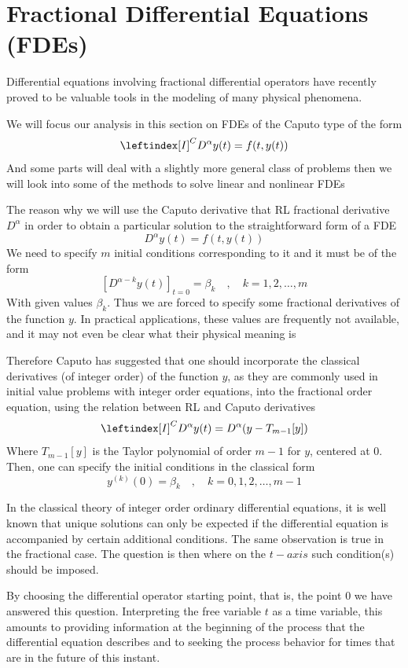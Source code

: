 \section{Fractional Differential Equations (FDEs)}
Differential equations involving fractional differential operators
have recently proved to be valuable tools in the modeling of many
physical phenomena.

We will focus our analysis in this section on FDEs of the Caputo type of the form
\begin{equation}
    \leftindex[I]^C {D^{\alpha}} y(t) = f(t,y(t))
\end{equation}
And some parts will deal with a slightly more general class of problems
then we will look into some of the methods to solve linear and nonlinear FDEs

The reason why we will use the Caputo derivative that RL fractional derivative $D^\alpha$ 
in order to obtain a particular solution to the straightforward form of a FDE
\[
    D^\alpha y(t) = f(t,y(t))
\]
We need to specify $m$ initial conditions corresponding to it and it must be of the form
\[
    \left[D^{\alpha-k} y(t)\right]_{t=0} = \beta_k \quad,\quad k = 1,2,\dots,m
\]
With given values $\beta_k$. Thus we are forced to specify some fractional derivatives
of the function $y$. In practical applications, these values are frequently
not available, and it may not even be clear what their physical meaning is

Therefore Caputo has suggested that one should incorporate the classical derivatives 
(of integer order) of the function $y$, as they are commonly used in initial value problems 
with integer order equations, into the fractional order equation, using the relation between RL and Caputo derivatives
\[
    \leftindex[I]^C {D^{\alpha}} y(t) = D^\alpha (y-T_{m-1}[y])
\]
Where $T_{m-1}[y]$ is the Taylor polynomial of order $m-1$ for $y$, centered at
$0$. Then, one can specify the initial conditions in the classical form
\[
    y^{(k)}(0) = \beta_k \quad,\quad k=0,1,2,\dots,m-1 
\]

In the classical theory of integer order ordinary differential equations, it is well
known that unique solutions can only be expected if the differential equation is accompanied by certain additional conditions. 
The same observation is true in the fractional case. The question is then where on the $t-axis$ such condition(s) should be imposed.

By choosing the differential operator starting point, that is, the point $0$ we have answered this question. 
Interpreting the free variable $t$ as a time variable,
this amounts to providing information at the beginning of the process that the
differential equation describes and to seeking the process behavior for times that are
in the future of this instant.

